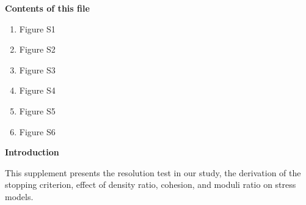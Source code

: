 \documentclass[draft,jgrga]{agutexSI2019}
\begin{document}
\begin{article}

%
%



\noindent\textbf{Contents of this file}
\begin{enumerate}
\item Figure S1
\item Figure S2
\item Figure S3
\item Figure S4
\item Figure S5
\item Figure S6
\end{enumerate}



\vspace{10mm} %

\noindent\textbf{Introduction}

This supplement presents the resolution test in our study, the derivation of the stopping criterion, effect of density ratio, cohesion, and moduli ratio on stress models.

\vspace{10mm} %


\end{article}
\end{document}
